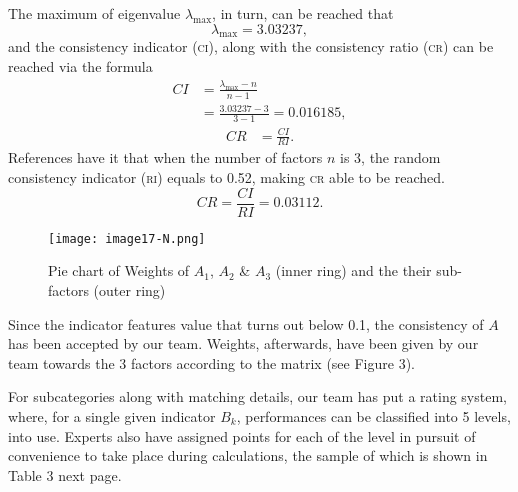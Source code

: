 \documentclass[12pt]{article}
\begin{document}
The maximum of eigenvalue $\lambda_{\max}$, in turn, can be reached that
\begin{equation*}
	\lambda_{\max}=3.03237,
\end{equation*}
and the consistency indicator (\textsc{ci}), along with the consistency ratio (\textsc{cr}) can be reached via the formula
\begin{equation}
	\begin{aligned}
		CI&=\frac{\lambda_{\max}-n}{n-1}\\
		&=\frac{3.03237-3}{3-1}=0.016185,
	\end{aligned}
\end{equation}
\begin{equation}
	\begin{aligned}
		CR&=\frac{CI}{RI}.
	\end{aligned}
\end{equation}
References have it that when the number of factors $n$ is 3, the random consistency indicator (\textsc{ri}) equals to 0.52, making \textsc{cr} able to be reached.
\begin{equation*}
	CR=\frac{CI}{RI}=0.03112.
\end{equation*}


\begin{wrapfigure}{r}{0.4\textwidth}
	\texttt{[image: image17-N.png]}
	\caption{Pie chart of Weights of $A_1$, $A_2$ \& $A_3$ (inner ring) and the their sub-factors (outer ring)}
\end{wrapfigure}


Since the indicator features value that turns out below 0.1, the consistency of $A$ has been accepted by our team. Weights, afterwards, have been given by our team towards the 3 factors according to the matrix (see Figure 3).

For subcategories along with matching details, our team has put a rating system, where, for a single given indicator $B_k$, performances can be classified into 5 levels, into use. Experts also have assigned points for each of the level in pursuit of convenience to take place during calculations, the sample of which is shown in Table 3 next page.
\end{document}
